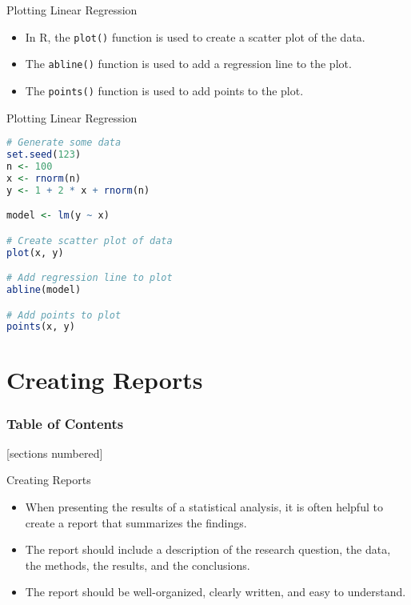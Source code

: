 \documentclass[serif, 9pt, aspectratio=32]{beamer}
\begin{document}
\begin{frame}{Plotting Linear Regression}
    \begin{itemize}
        \setlength{\itemsep}{2em}
        \item In R, the \texttt{plot()} function is used to create a scatter plot of the data.
        \item The \texttt{abline()} function is used to add a regression line to the plot.
        \item The \texttt{points()} function is used to add points to the plot.
    \end{itemize}
\end{frame}

\begin{frame}[fragile]{Plotting Linear Regression}
    \begin{lstlisting}[language=R]
# Generate some data
set.seed(123)
n <- 100
x <- rnorm(n)
y <- 1 + 2 * x + rnorm(n)

model <- lm(y ~ x)

# Create scatter plot of data
plot(x, y)

# Add regression line to plot
abline(model)

# Add points to plot
points(x, y)
    \end{lstlisting}
\end{frame}

\section{Creating Reports}

\begin{frame}
    \frametitle{Table of Contents}
    [sections numbered]
    \tableofcontents[currentsection]
\end{frame}

\begin{frame}{Creating Reports}
    \begin{itemize}
        \setlength{\itemsep}{2em}
        \item When presenting the results of a statistical analysis, it is often helpful to create a report that summarizes the findings.
        \item The report should include a description of the research question, the data, the methods, the results, and the conclusions.
        \item The report should be well-organized, clearly written, and easy to understand.
    \end{itemize}
\end{frame}
\end{document}
